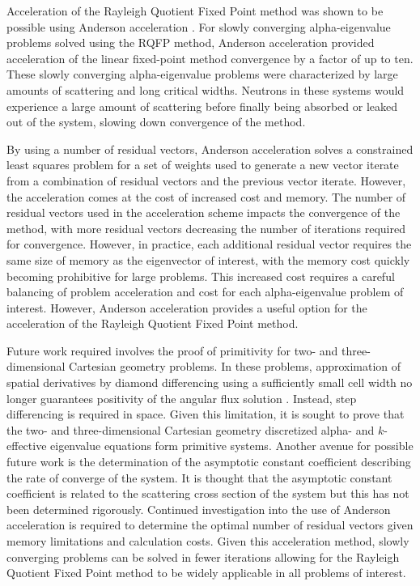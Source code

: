 Acceleration of the Rayleigh Quotient Fixed Point method was shown to be possible using Anderson acceleration \cite{walker_anderson_2011}. For slowly converging alpha-eigenvalue problems solved using the RQFP method, Anderson acceleration provided acceleration of the linear fixed-point method convergence by a factor of up to ten. These slowly converging alpha-eigenvalue problems were characterized by large amounts of scattering and long critical widths. Neutrons in these systems would experience a large amount of scattering before finally being absorbed or leaked out of the system, slowing down convergence of the method.

By using a number of residual vectors, Anderson acceleration solves a constrained least squares problem for a set of weights used to generate a new vector iterate from a combination of residual vectors and the previous vector iterate. However, the acceleration comes at the cost of increased cost and memory. The number of residual vectors used in the acceleration scheme impacts the convergence of the method, with more residual vectors decreasing the number of iterations required for convergence. However, in practice, each additional residual vector requires the same size of memory as the eigenvector of interest, with the memory cost quickly becoming prohibitive for large problems. This increased cost requires a careful balancing of problem acceleration and cost for each alpha-eigenvalue problem of interest. However, Anderson acceleration provides a useful option for the acceleration of the Rayleigh Quotient Fixed Point method.

Future work required involves the proof of primitivity for two- and three-dimensional Cartesian geometry problems. In these problems, approximation of spatial derivatives by diamond differencing using a sufficiently small cell width no longer guarantees positivity of the angular flux solution \cite{greenbaum_iterative_1997}. Instead, step differencing is required in space. Given this limitation, it is sought to prove that the two- and three-dimensional Cartesian geometry discretized alpha- and $k$-effective eigenvalue equations form primitive systems. Another avenue for possible future work is the determination of the asymptotic constant coefficient describing the rate of converge of the system. It is thought that the asymptotic constant coefficient is related to the scattering cross section of the system but this has not been determined rigorously. Continued investigation into the use of Anderson acceleration is required to determine the optimal number of residual vectors given memory limitations and calculation costs. Given this acceleration method, slowly converging problems can be solved in fewer iterations allowing for the Rayleigh Quotient Fixed Point method to be widely applicable in all problems of interest.